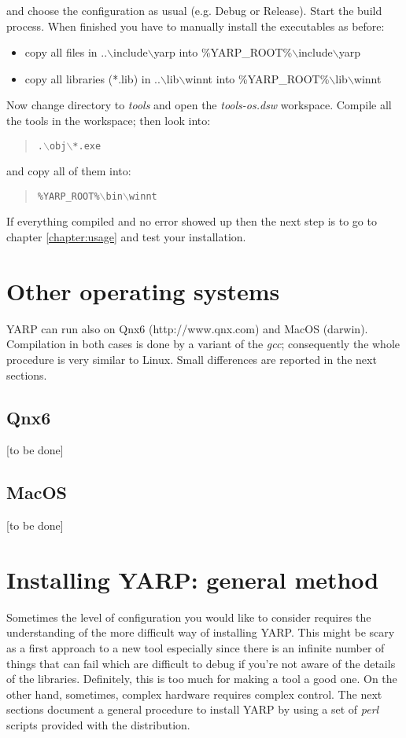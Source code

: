 \noindent and choose the configuration as usual (e.g. Debug or Release). Start the build process. When finished you have to manually install the executables as before:

\begin{itemize}
\item copy all files in ..$\backslash$include$\backslash$yarp into \%YARP\_ROOT\%$\backslash$include$\backslash$yarp
\item copy all libraries (*.lib) in ..$\backslash$lib$\backslash$winnt into
\%YARP\_ROOT\%$\backslash$lib$\backslash$winnt
\end{itemize}

Now change directory to {\em tools} and open the {\em tools-os.dsw} workspace. Compile all the tools in the workspace; then look into:

\begin{quote}
{\tt .$\backslash$obj$\backslash$*.exe}
\end{quote}

\noindent and copy all of them into:

\begin{quote}
{\tt \%YARP\_ROOT\%$\backslash$bin$\backslash$winnt}
\end{quote}

If everything compiled and no error showed up then the next step is to go to chapter \ref{chapter:usage} and test your installation. 

\section{Other operating systems}
YARP can run also on Qnx6 (http://www.qnx.com) and MacOS (darwin). Compilation in both cases is done by a variant of the {\em gcc}; consequently the whole procedure is very similar to Linux. Small differences are reported in the next sections.

\subsection{Qnx6}
[to be done]

\subsection{MacOS}
[to be done]


\section{Installing YARP: general method}
Sometimes the level of configuration you would like to consider requires the understanding of the more difficult way of installing YARP. This might be scary as a first approach to a new tool especially since there is an infinite number of things that can fail which are difficult to debug if you're not aware of the details of the libraries. Definitely, this is too much for making a tool a good one. On the other hand, sometimes, complex hardware requires complex control. The next sections document a general procedure to install YARP by using a set of {\em perl} scripts provided with the distribution.

